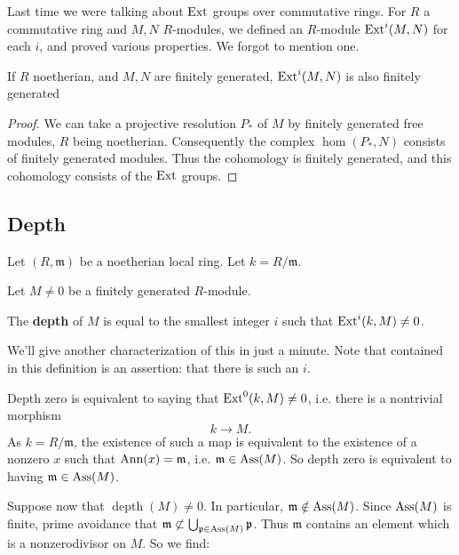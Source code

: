 Last time we were talking about $\operatorname{Ext}$ groups over commutative
rings. For $R$ a
commutative ring and $M,N$ $R$-modules, we defined an $R$-module
$\operatorname{Ext}^i(M,N)$ for
each $i$, and proved various properties. We forgot to mention
one.

\begin{proposition}
If $R$ noetherian, and $M,N$ are finitely generated,
$\operatorname{Ext}^i(M,N)$ is also finitely generated
\end{proposition}
\begin{proof}
We can take a projective resolution $P_*$ of $M$ by finitely
generated free modules, $R$ being
noetherian. Consequently the complex $\hom(P_*, N)$ consists of
finitely
generated modules. Thus the cohomology is finitely generated,
and this cohomology
consists of the $\operatorname{Ext}$ groups.
\end{proof}


\subsection{Depth} Let $(R, \mathfrak{m})$ be  a noetherian
local ring. Let $k = R/\mathfrak{m}$.

Let $M \neq 0$ be a finitely generated $R$-module.

\newcommand{\depth}{\operatorname{depth}}
\begin{definition}
The \textbf{depth} of $M$ is equal to the smallest integer $i$
such that
$\operatorname{Ext}^i(k,M) \neq 0$.
\end{definition}

We'll give another characterization of this in just a minute.
Note that
contained in this definition is an assertion: that there is such
an $i$.

\begin{example}
Depth zero is equivalent to saying that $\operatorname{Ext}^0(k,M) \neq 0$,
i.e. there is a
nontrivial morphism
\[ k \to M.  \]
As $k = R/\mathfrak{m}$, the existence of such a map is
equivalent to the existence of a nonzero $x$
such that $\operatorname{Ann}(x) = \mathfrak{m}$, i.e. $\mathfrak{m} \in
\operatorname{Ass}(M)$. So depth
zero is equivalent to having $\mathfrak{m} \in \operatorname{Ass}(M)$.
\end{example}

Suppose now that $\depth(M) \neq 0$. In particular,
$\mathfrak{m} \notin
\operatorname{Ass}(M)$. Since $\operatorname{Ass}(M)$ is finite, prime avoidance that
$\mathfrak{m}
\not\subset \bigcup_{\mathfrak{p} \in \operatorname{Ass}(M)} \mathfrak{p}$.
Thus
$\mathfrak{m}$ contains an element which is a nonzerodivisor on
$M$. So we find:


